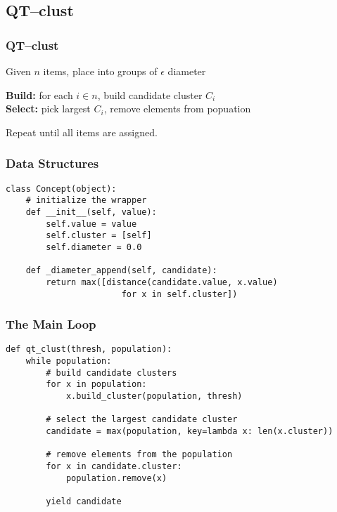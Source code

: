 \documentclass{beamer}
\begin{document}
\subsection{QT--clust}
\begin{frame}
\frametitle{QT--clust}
Given $n$ items, place into groups of $\epsilon$ diameter\\

\bigskip

\textbf{Build:} for each $i \in n$, build candidate cluster $C_i$ \\
\textbf{Select:} pick largest $C_i$, remove elements from popuation \\

\bigskip

Repeat until all items are assigned.

\end{frame}

\begin{frame}[fragile]
\frametitle{Data Structures}
\begin{verbatim}
class Concept(object):
    # initialize the wrapper
    def __init__(self, value):
        self.value = value
        self.cluster = [self] 
        self.diameter = 0.0
    
    def _diameter_append(self, candidate):
        return max([distance(candidate.value, x.value) 
                       for x in self.cluster])
\end{verbatim}
\end{frame}

\begin{frame}[fragile]
\frametitle{The Main Loop}
\begin{verbatim}
def qt_clust(thresh, population):
    while population:
        # build candidate clusters
        for x in population:
            x.build_cluster(population, thresh)
    
        # select the largest candidate cluster
        candidate = max(population, key=lambda x: len(x.cluster))
  
        # remove elements from the population
        for x in candidate.cluster:
            population.remove(x)
    
        yield candidate
\end{verbatim}
\end{frame}
\end{document}
